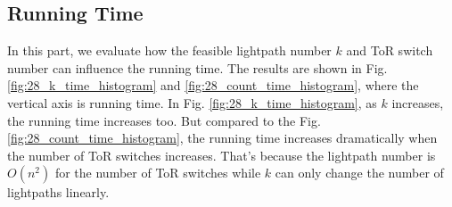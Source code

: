 \subsection{Running Time}
In this part, we evaluate how the feasible lightpath number $k$ and ToR switch number can influence the running time. The results are shown in Fig. \ref{fig:28_k_time_histogram} and \ref{fig:28_count_time_histogram}, where the vertical axis is running time. In Fig. \ref{fig:28_k_time_histogram}, as $k$ increases, the running time increases too. But compared to the Fig. \ref{fig:28_count_time_histogram}, the running time increases dramatically when the number of ToR switches increases. That's because the lightpath number is $O(n^2)$ for the number of ToR switches while $k$ can only change the number of lightpaths linearly.

\begin{figure}
\centering

\begin{minipage}[c]{0.23\textwidth}
\centering


\end{minipage}
\end{figure}
